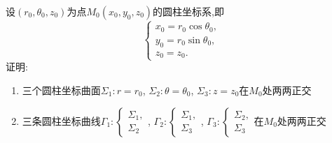 \begin{example}
    设$(r_0,\theta_0,z_0)$为点$M_0(x_0,y_0,z_0)$的圆柱坐标系,即
    $$\begin{cases}
        x_0 = r_0 \cos \theta_0,\\
        y_0 = r_0 \sin \theta_0,\\
        z_0 = z_0.
    \end{cases}$$
    证明:
    \begin{enumerate}
        \item 三个圆柱坐标曲面$\Sigma_1: r = r_0$, $\Sigma_2: \theta = \theta_0$, $\Sigma_3: z = z_0$在$M_0$处两两正交
        \item 三条圆柱坐标曲线$\Gamma_1: \begin{cases}
            \Sigma_1,\\
            \Sigma_2
        \end{cases}$, $\Gamma_2: \begin{cases}
            \Sigma_1,\\
            \Sigma_3
        \end{cases}$, $\Gamma_3: \begin{cases}
            \Sigma_2,\\
            \Sigma_3
        \end{cases}$在$M_0$处两两正交
    \end{enumerate}
\end{example}

